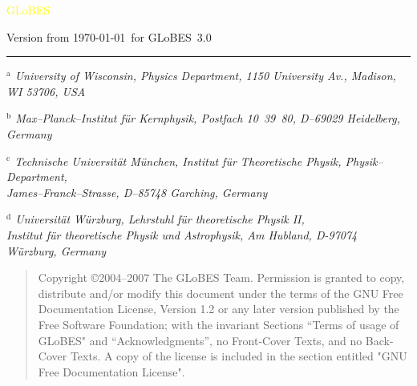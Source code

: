 \documentclass[a4paper,12pt,twoside]{book}
\newcommand{\GLOBES}{{\sf GLoBES}}
\begin{document}
{\begin{center}
\vspace*{-1cm}

{\Huge \textcolor{yellow}{GLoBES}}
\end{center}

\vspace{1cm}

\begin{center}
Version from \today\ for \GLOBES\ 3.0
\end{center}


\vspace*{0.5cm}
\vfill
\hrule

\vspace*{0.1cm}

{\em\small $^{\mathrm{a}}$%
       University of Wisconsin,  Physics Department,
       1150 University Av., Madison, WI 53706, USA}

{\em\small $^{\mathrm{b}}$%
       Max--Planck--Institut f\"ur Kernphysik, 
       Postfach 10~39~80, D--69029 Heidelberg, Germany} 

{\em\small $^{\mathrm{c}}$%
       Technische Universit\"at M\"unchen,
       Institut f\"ur Theoretische Physik, Physik--Department,\\
       James--Franck--Strasse, D--85748 Garching, Germany}

{\em\small $^{\mathrm{d}}$%
       Universit\"at W\"urzburg, 
       Lehrstuhl f\"ur theoretische Physik II, \\
       Institut f\"ur theoretische Physik und Astrophysik, 
       Am Hubland,
       D-97074 W\"urzburg, Germany}



}


\clearpage
\thispagestyle{empty}
\bigskip
\begin{quote}
    Copyright \copyright  2004--2007  The GLoBES Team.
    Permission is granted to copy, distribute and/or modify this document
    under the terms of the GNU Free Documentation License, Version 1.2
    or any later version published by the Free Software Foundation;
    with the invariant Sections ``Terms of usage of \GLOBES" 
    and ``Acknowledgments'', no Front-Cover Texts, and no Back-Cover Texts.
    A copy of the license is included in the section entitled "GNU
    Free Documentation License".
\end{quote}
\bigskip
    
\end{document}
